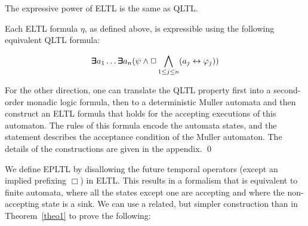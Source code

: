\begin{theorem}
\label{theo1}
The expressive power of 
ELTL is the same as QLTL.
\end{theorem}
Each ELTL formula $\eta$, as defined above,
is expressible using the following equivalent QLTL formula:

\[   \bm{\exists}\kern-0.6em\bm{\exists} a_1 \ldots \bm{\exists}\kern-0.6em\bm{\exists} a_n  ( \psi  \wedge   \Box \bigwedge_{1 \leq j \leq n} ( a_j \leftrightarrow \varphi_j))
\]


\noindent
For the other direction, one can translate the QLTL property first into
a second-order monadic logic formula, then to a deterministic Muller automata and then construct an ELTL formula that holds for the accepting executions of this automaton. The rules of this formula encode the automata states, and the statement describes the acceptance condition of the Muller automaton.
The details of the
constructions are given in the appendix. \qed

We define EPLTL by disallowing the future temporal operators (except an implied prefixing $\Box$) in ELTL. This results in
a formalism that is equivalent to finite automata, where all the states except one are accepting and where the non-accepting state is a sink. 
We can use a related, but simpler construction than in Theorem~\ref{theo1} to prove the following:


